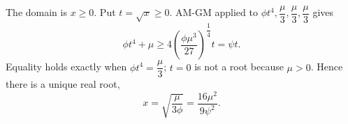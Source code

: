 The domain is $x\ge0$. Put $t=\sqrt x\ge0$. AM-GM applied to $\phi t^4,\dfrac{\mu}{3},\dfrac{\mu}{3},\dfrac{\mu}{3}$ gives
\[
\phi t^4+\mu\ge4\left(\dfrac{\phi\mu^3}{27}\right)^{\dfrac{1}{4}}t=\psi t.
\]
Equality holds exactly when $\phi t^4=\dfrac{\mu}{3}$; $t=0$ is not a root because $\mu>0$. Hence there is a unique real root,
\[
\boxed{x=\sqrt{\dfrac{\mu}{3\phi}}=\dfrac{16\mu^2}{9\psi^2}}.
\]
